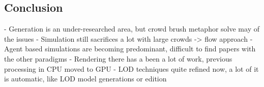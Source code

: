 \documentclass[6pt]{article} %
\begin{document}
\begin{multicols}{2}
\section{Conclusion}

- Generation is an under-researched area, but crowd brush metaphor solve may of the issues
- Simulation still sacrifices a lot with large crowds -> flow approach
- Agent based simulations are becoming predominant, difficult to find papers with the other paradigms
- Rendering there has a been a lot of work, previous processing in CPU moved to GPU
- LOD techniques quite refined now, a lot of it is automatic, like LOD model generations or edition

\end{multicols}
\end{document}
